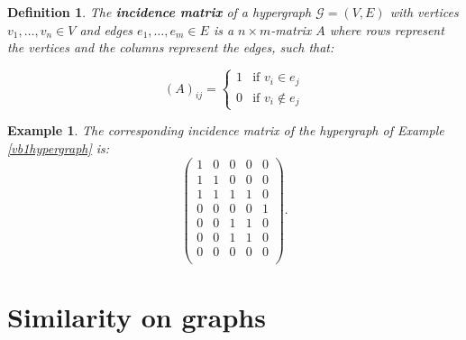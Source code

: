 \documentclass[a4paper,11pt]{report}
\newtheorem{example}[theorem]{Example}
\newtheorem{definition}[theorem]{Definition}
\newcommand{\hgraf}{\mathcal{G}}
\begin{document}
\begin{definition}\label{incidencematrixhypergraph}
  The \textbf{incidence matrix} of a hypergraph $\hgraf = (V, E)$ with vertices
  $v_1, \ldots, v_n \in V$ and edges $e_1, \ldots, e_m \in E$ is a $n\times m$-matrix $A$ 
  where rows represent the vertices and the columns represent the 
  edges, such that:
  
 $$(A)_{ij} = \begin{cases} 1 &\mbox{if } v_i \in e_j   \\ 
0 & \mbox{if } v_i \not\in e_j \end{cases}$$
\end{definition}
\begin{example}
  The corresponding incidence matrix of the hypergraph of Example \ref{vb1hypergraph} 
  is:
  $$\begin{pmatrix}
    1 & 0 & 0 & 0 & 0\\
    1 & 1 & 0 & 0 & 0\\
    1 & 1 & 1 & 1 & 0\\
    0 & 0 & 0 & 0 & 1\\
    0 & 0 & 1 & 1 & 0\\
    0 & 0 & 1 & 1 & 0\\
    0 & 0 & 0 & 0 & 0\\
  \end{pmatrix}.$$
\end{example}







\chapter{Similarity on graphs}
\end{document}
